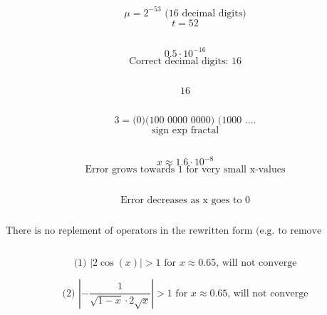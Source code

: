 \documentclass[12pt]{article}
\begin{document}
\setcounter{section}{2}
\subsection{}
$$\mu = 2^{-53} \text{ (16 decimal digits)}$$
$$t = 52$$

\subsection{}
$$0.5\cdot 10^{-16}$$
$$\text{Correct decimal digits: }16$$

\subsection{}
$$16$$

\subsection{}
$$3 =  \text{(0)(100 0000 0000) (1000 ....}$$
$$\text{sign exp fractal}$$

\setcounter{section}{3}
\setcounter{subsection}{0}

\subsection{}
$$x\approx 1.6 \cdot 10^{-8}$$
$$\text{Error grows towards 1 for very small x-values}$$

\subsection{}
$$\text{Error decreases as x goes to 0}$$

\subsection{}

$$\text{There is no replement of operators in the rewritten form (e.g. to remove cancellation)}$$

\setcounter{section}{4}
\setcounter{subsection}{0}

\subsection{}

$$\text{(1) } |2\cos(x)| > 1 \text{ for } x\approx 0.65 \text{, will not converge}$$

$$\text{(2) } |-\frac{1}{\sqrt{1-x}\cdot2\sqrt{x}}| > 1 \text{ for } x\approx 0.65 \text{, will not converge}$$
\end{document}
